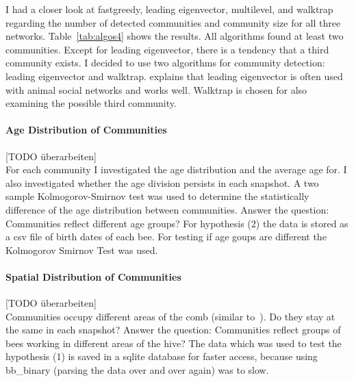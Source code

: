 I had a closer look at fastgreedy, leading eigenvector, multilevel, and walktrap regarding the number of detected communities and community size for all three networks. Table~\ref{tab:algos4} shows the results. All algorithms found at least two communities. Except for leading eigenvector, there is a tendency that a third community exists.
I decided to use two algorithms for community detection: leading eigenvector and walktrap. \textcite{farine2015constructing} explains that leading eigenvector is often used with animal social networks and works well. Walktrap is chosen for also  examining the possible third community.




\paragraph{Age Distribution of Communities}
[TODO überarbeiten]\\
For each community I investigated the age distribution and the average age for. I also investigated whether the age division persists in each snapshot. A two sample Kolmogorov-Smirnov test was used to determine the statistically difference of the age distribution between communities.
Answer the question: Communities reflect different age groups?
For hypothesis (2) the data is stored as a csv file of birth dates of each bee. For testing if age goups are different the Kolmogorov Smirnov Test was used.\\

\paragraph{Spatial Distribution of Communities}
[TODO überarbeiten]\\
Communities occupy different areas of the comb (similar to~\cite{baracchi2014socio}). Do they stay at the same in each snapshot?
Answer the question: Communities reflect groups of bees working in different areas of the hive? The data which was used to test the hypothesis (1) is saved in a sqlite database for faster access, because using bb\_binary (parsing the data over and over again) was to slow.\\

